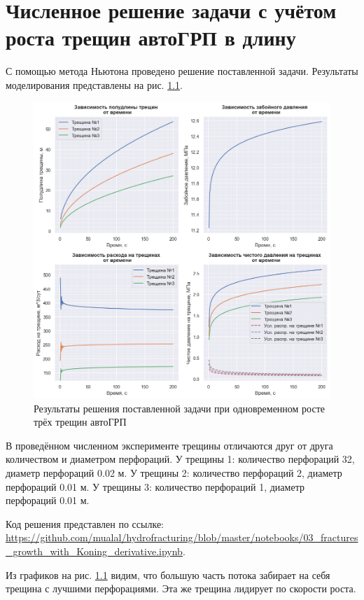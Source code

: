 \chapter{Численное решение задачи с учётом роста трещин автоГРП в длину} \label{ch3}

С помощью метода Ньютона проведено решение поставленной задачи.
Результаты моделирования представлены на рис. \ref{fig:results1}.
 
\begin{figure}[H] 
\center
\includegraphics[width=0.9\linewidth]{images/Kirchhoff+Koning_1.png}
\caption{Результаты решения поставленной задачи при одновременном росте трёх трещин автоГРП} 
\label{fig:results1}  
\end{figure}

В проведённом численном эксперименте трещины отличаются друг от друга количеством и диаметром перфораций.\newline
У трещины 1: количество перфораций 32, диаметр перфораций 0.02 м.\newline
У трещины 2: количество перфораций 2, диаметр перфораций 0.01 м.\newline
У трещины 3: количество перфораций 1, диаметр перфораций 0.01 м.

Код решения представлен по ссылке: \url{https://github.com/mualal/hydrofracturing/blob/master/notebooks/03_fractures_growth_with_Koning_derivative.ipynb}.

Из графиков на рис. \ref{fig:results1} видим, что большую часть потока забирает на себя трещина с лучшими перфорациями.
Эта же трещина лидирует по скорости роста.

